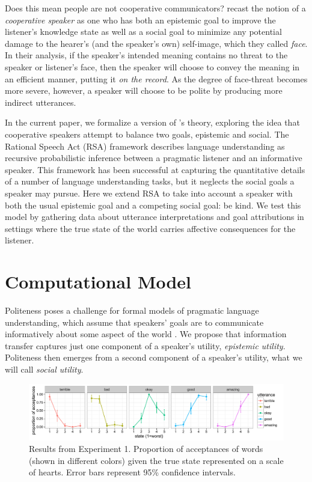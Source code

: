 \documentclass[10pt,letterpaper]{article}
\begin{document}
Does this mean people are not cooperative communicators? 
 recast the notion of a \emph{cooperative speaker} as one
who has both an epistemic goal to improve the listener's knowledge state as well as a social goal to minimize any potential damage to the hearer's (and the speaker's own) self-image, which they called \emph{face}.
In their analysis, if the speaker's intended meaning contains no threat to the speaker or listener's face,
then the speaker will choose to convey the meaning in an efficient manner, putting it \emph{on the record}.
As the degree of face-threat becomes more severe, however,
a speaker will choose to be polite by producing more indirect utterances.

In the current paper, we formalize a version of 's theory, exploring the idea that cooperative speakers attempt to balance two goals, epistemic and social.
The Rational Speech Act (RSA) framework \cite{Frank2012, Goodman2013} describes language understanding as recursive probabilistic inference between a pragmatic listener and an informative speaker. This framework has been successful at capturing the quantitative details of a number of language understanding tasks, but it neglects the social goals a speaker may pursue.
Here we extend RSA to take into account a speaker with both the usual epistemic goal and a competing social goal: be kind.
We test this model by gathering data about utterance interpretations and goal attributions in settings where the true state of the world carries affective consequences for the listener.


\section{Computational Model}

Politeness poses a challenge for formal models of pragmatic language understanding, which assume that speakers' goals are to communicate informatively about some aspect of the world \cite{Frank2012, Goodman2013}.
We propose that information transfer captures just one component of a speaker's utility, \emph{epistemic utility}.
Politeness then emerges from a second component of a speaker's utility, what we will call \emph{social utility}.


\begin{figure}[!b]
\begin{center}
  \includegraphics[width=.9\textwidth]{figures/exp1.pdf}
  \caption{\label{fig:exp1} Results from Experiment 1. Proportion of acceptances of words (shown in different colors) given the true state represented on a scale of hearts. Error bars represent 95\% confidence intervals.}
  \end{center}
\end{figure}
\end{document}
